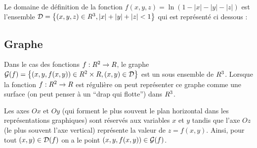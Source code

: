 \sld{\vfill\pagebreak[5]}%
\begin{exemple}
    Le domaine de définition de la fonction $f(x,y,z) = \ln(1 - |x| - |y| - |z|)$ est l'ensemble $\mathcal{D} = \big\{ (x,y,z)\in R^3, |x|+|y|+|z| < 1 \big\}$ qui est représenté ci dessous :
    \begin{center}
        \begin{minipage}{5cm}
            \tikzexternalenable
            \tikzexternaldisable
        \end{minipage}
    \end{center}

\end{exemple}


\sld{\vfill\pagebreak[5]}%

\subsection{Graphe}
Dans le cas des fonctions $f:R^2 \to R$, le graphe $\mathcal{G}(f) = \left\{ (x,y,f(x,y))\in R^2 \times R, (x,y) \in \mathcal{D} \right\}$ est un sous ensemble de $R^3$. Lorsque la fonction $f:R^2\to R$ est régulière on peut représenter ce graphe comme une surface (on peut penser à un ``drap qui flotte'') dans $R^3$.

Les axes $Ox$ et $Oy$ (qui forment le plus souvent le plan horizontal dans les représentations graphiques) sont réservés aux variables $x$ et $y$ tandis que l'axe $Oz$ (le plus souvent l'axe vertical) représente la valeur de $z = f(x,y)$. Ainsi, pour tout $(x,y) \in \mathcal{D}(f)$ on a le point $(x,y,f(x,y)) \in \mathcal{G}(f)$. 
\begin{center}
    
\end{center}



